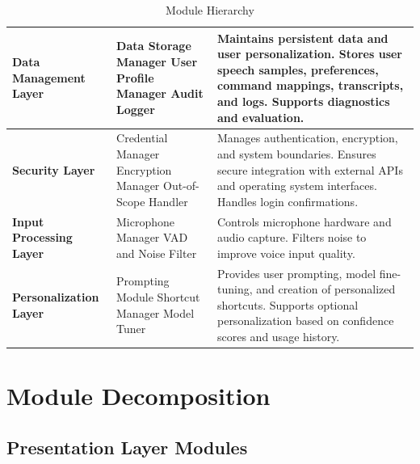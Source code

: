 \documentclass[12pt, titlepage]{article}
\begin{document}
\begin{table}[htbp]
\begin{tabular}{
    >{\raggedright\arraybackslash}p{3cm}
    >{\raggedright\arraybackslash}p{4.8cm}
    >{\raggedright\arraybackslash}p{8.2cm}
}
\textbf{Data Management Layer} &
Data Storage Manager \newline
User Profile Manager \newline
Audit Logger &
Maintains persistent data and user personalization. Stores user speech samples, preferences, command mappings, transcripts, and logs. Supports diagnostics and evaluation. \\
\midrule

\textbf{Security Layer} &
Credential Manager \newline
Encryption Manager \newline
Out-of-Scope Handler &
Manages authentication, encryption, and system boundaries. Ensures secure integration with external APIs and operating system interfaces. Handles login confirmations. \\
\midrule

\textbf{Input Processing Layer} &
Microphone Manager \newline
VAD and Noise Filter &
Controls microphone hardware and audio capture. Filters noise to improve voice input quality. \\
\midrule

\textbf{Personalization Layer} &
Prompting Module \newline
Shortcut Manager \newline
Model Tuner &
Provides user prompting, model fine-tuning, and creation of personalized shortcuts. Supports optional personalization based on confidence scores and usage history. \\

\bottomrule
\end{tabular}
\caption{Module Hierarchy}
\label{TblMH}
\end{table}
\newpage

\section{Module Decomposition} \label{SecMD}
\subsection*{Presentation Layer Modules}
\end{document}
